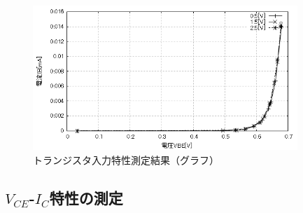 \documentclass[titlepage]{jarticle}
\begin{document}
\begin{figure}[H]
    \begin{center}
        \includegraphics[width=10cm]{graph/5.png}
        \caption{トランジスタ入力特性測定結果（グラフ）}
        \label{fig:トランジスタ入力特性測定結果（グラフ）}
    \end{center}
\end{figure}

\subsection{$V_{CE}$-$I_C$特性の測定}
\end{document}
